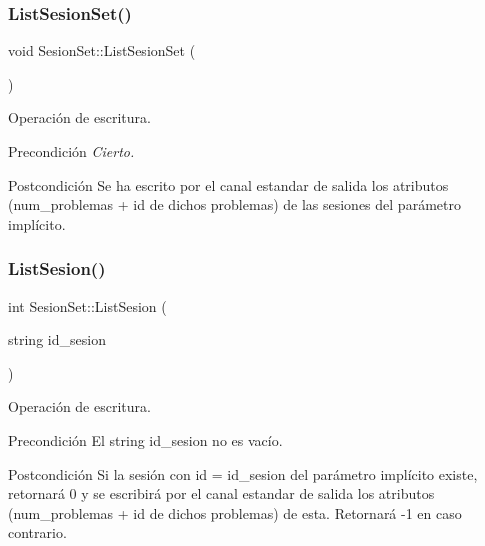 \subsubsection{\texorpdfstring{List\+Sesion\+Set()}{ListSesionSet()}}
{\footnotesize\ttfamily void Sesion\+Set\+::\+List\+Sesion\+Set (\begin{DoxyParamCaption}{ }\end{DoxyParamCaption})}



Operación de escritura. 

\begin{DoxyPrecond}{Precondición}
{\itshape Cierto.} 
\end{DoxyPrecond}
\begin{DoxyPostcond}{Postcondición}
Se ha escrito por el canal estandar de salida los atributos (num\+\_\+problemas + id de dichos problemas) de las sesiones del parámetro implícito. 
\end{DoxyPostcond}
\mbox{\label{class_sesion_set_a5edd3e0c7231ffd474be2f350f116fcb}} 
\subsubsection{\texorpdfstring{List\+Sesion()}{ListSesion()}}
{\footnotesize\ttfamily int Sesion\+Set\+::\+List\+Sesion (\begin{DoxyParamCaption}\item[{string}]{id\+\_\+sesion }\end{DoxyParamCaption})}



Operación de escritura. 

\begin{DoxyPrecond}{Precondición}
El string id\+\_\+sesion no es vacío. 
\end{DoxyPrecond}
\begin{DoxyPostcond}{Postcondición}
Si la sesión con id = id\+\_\+sesion del parámetro implícito existe, retornará 0 y se escribirá por el canal estandar de salida los atributos (num\+\_\+problemas + id de dichos problemas) de esta. Retornará -\/1 en caso contrario. 
\end{DoxyPostcond}
\mbox{\label{class_sesion_set_a61757f0827ae258cc37fcd3574e20b70}} 

